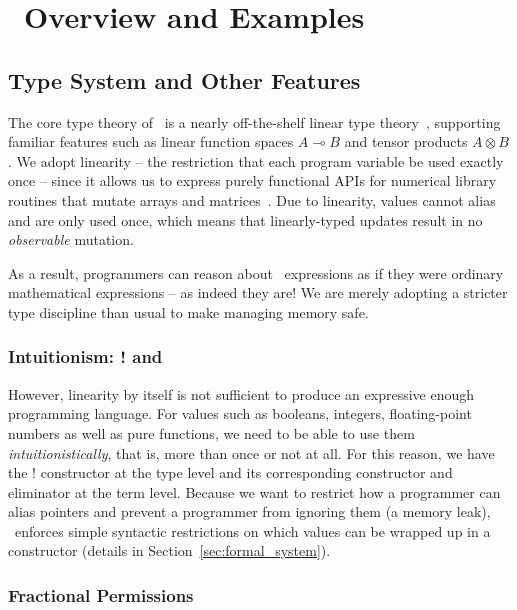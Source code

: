 \section{\lang\ Overview and Examples}\label{sec:lang_and_examples}

\subsection{Type System and Other Features}

The core type theory of \lang\ is a nearly off-the-shelf linear type
theory~\cite{barber1996}, supporting familiar features such as linear function
spaces $A \multimap B$ and tensor products $A \otimes B$. We adopt linearity --
the restriction that each program variable be used exactly once -- since it
allows us to express purely functional APIs for numerical library routines that
mutate arrays and matrices~\cite{Wadler90}. Due to linearity, values cannot
alias and are only used once, which means that linearly-typed updates result in
no \emph{observable} mutation.

As a result, programmers can reason about \lang\ expressions as if they
were ordinary mathematical expressions -- as indeed they are! We are
merely adopting a stricter type discipline than usual to make managing
memory safe.

\subsubsection{Intuitionism: ! and \texorpdfstring{}{Many}}

However, linearity by itself is not sufficient to produce an expressive enough
programming language. For values such as booleans, integers, floating-point
numbers as well as pure functions, we need to be able to use them
\emph{intuitionistically}, that is, more than once or not at all. For this
reason, we have the ! constructor at the type level and its corresponding
 constructor and  eliminator at
the term level. Because we want to restrict how a programmer can alias pointers
and prevent a programmer from ignoring them (a memory leak), \lang\ enforces
simple syntactic restrictions on which values can be wrapped up in a
 constructor (details in Section~\ref{sec:formal_system}).

\subsubsection{Fractional Permissions}\label{subsubsec:frac_perm}


